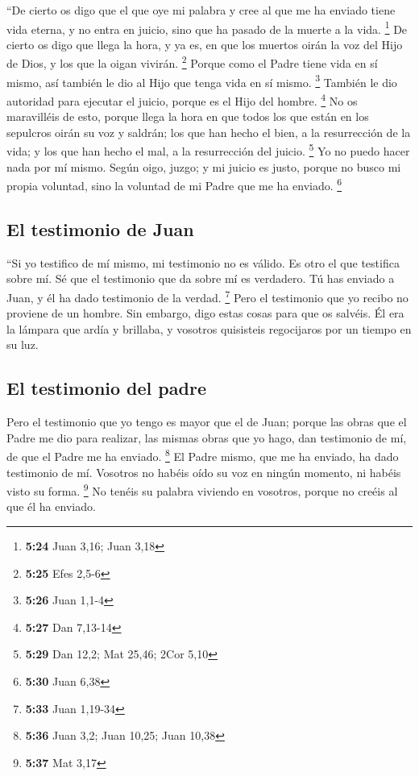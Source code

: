  ``De cierto os digo que el que oye mi palabra y cree al
que me ha enviado tiene vida eterna, y no entra en juicio, sino que ha
pasado de la muerte a la vida. \footnote{\textbf{5:24} Juan 3,16; Juan
  3,18}  De cierto os digo que llega la hora, y ya es, en
que los muertos oirán la voz del Hijo de Dios, y los que la oigan
vivirán. \footnote{\textbf{5:25} Efes 2,5-6}  Porque como
el Padre tiene vida en sí mismo, así también le dio al Hijo que tenga
vida en sí mismo. \footnote{\textbf{5:26} Juan 1,1-4} 
También le dio autoridad para ejecutar el juicio, porque es el Hijo del
hombre. \footnote{\textbf{5:27} Dan 7,13-14}  No os
maravilléis de esto, porque llega la hora en que todos los que están en
los sepulcros oirán su voz  y saldrán; los que han hecho
el bien, a la resurrección de la vida; y los que han hecho el mal, a la
resurrección del juicio. \footnote{\textbf{5:29} Dan 12,2; Mat 25,46;
  2Cor 5,10}  Yo no puedo hacer nada por mí mismo. Según
oigo, juzgo; y mi juicio es justo, porque no busco mi propia voluntad,
sino la voluntad de mi Padre que me ha enviado. \footnote{\textbf{5:30}
  Juan 6,38}

\hypertarget{el-testimonio-de-juan}{%
\subsection{El testimonio de Juan}\label{el-testimonio-de-juan}}

 ``Si yo testifico de mí mismo, mi testimonio no es
válido.  Es otro el que testifica sobre mí. Sé que el
testimonio que da sobre mí es verdadero.  Tú has enviado
a Juan, y él ha dado testimonio de la verdad. \footnote{\textbf{5:33}
  Juan 1,19-34}  Pero el testimonio que yo recibo no
proviene de un hombre. Sin embargo, digo estas cosas para que os
salvéis.  Él era la lámpara que ardía y brillaba, y
vosotros quisisteis regocijaros por un tiempo en su luz.

\hypertarget{el-testimonio-del-padre}{%
\subsection{El testimonio del padre}\label{el-testimonio-del-padre}}

 Pero el testimonio que yo tengo es mayor que el de Juan;
porque las obras que el Padre me dio para realizar, las mismas obras que
yo hago, dan testimonio de mí, de que el Padre me ha enviado.
\footnote{\textbf{5:36} Juan 3,2; Juan 10,25; Juan 10,38}
 El Padre mismo, que me ha enviado, ha dado testimonio de
mí. Vosotros no habéis oído su voz en ningún momento, ni habéis visto su
forma. \footnote{\textbf{5:37} Mat 3,17}  No tenéis su
palabra viviendo en vosotros, porque no creéis al que él ha enviado.

